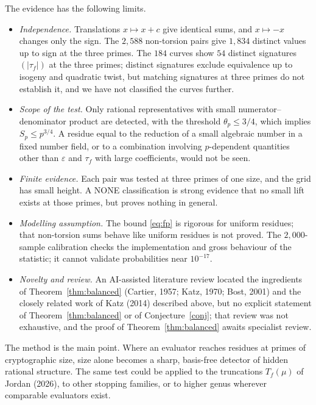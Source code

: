 \documentclass[11pt,a4paper]{article}
\numberwithin{equation}{section}
\theoremstyle{plain}
\theoremstyle{definition}
\newcommand{\eps}{\varepsilon}
\begin{document}
The evidence has the following limits.
\begin{itemize}[leftmargin=1.5em,itemsep=2pt]
\item \emph{Independence.} Translations $x\mapsto x+c$ give identical sums, and $x\mapsto-x$ changes only the sign. The $2{,}588$ non-torsion pairs give $1{,}834$ distinct values up to sign at the three primes. The $184$ curves show $54$ distinct signatures $(|\tau_f|)$ at the three primes; distinct signatures exclude equivalence up to isogeny and quadratic twist, but matching signatures at three primes do not establish it, and we have not classified the curves further.
\item \emph{Scope of the test.} Only rational representatives with small numerator--denominator product are detected, with the threshold $\theta_p\le3/4$, which implies $S_p\le p^{3/4}$. A residue equal to the reduction of a small algebraic number in a fixed number field, or to a combination involving $p$-dependent quantities other than $\eps$ and $\tau_f$ with large coefficients, would not be seen.
\item \emph{Finite evidence.} Each pair was tested at three primes of one size, and the grid has small height. A NONE classification is strong evidence that no small lift exists at those primes, but proves nothing in general.
\item \emph{Modelling assumption.} The bound \eqref{eq:fp} is rigorous for uniform residues; that non-torsion sums behave like uniform residues is not proved. The $2{,}000$-sample calibration checks the implementation and gross behaviour of the statistic; it cannot validate probabilities near $10^{-17}$.
\item \emph{Novelty and review.} An AI-assisted literature review located the ingredients of Theorem~\ref{thm:balanced} (Cartier, 1957; Katz, 1970; Bost, 2001) and the closely related work of Katz (2014) described above, but no explicit statement of Theorem~\ref{thm:balanced} or of Conjecture~\ref{conj}; that review was not exhaustive, and the proof of Theorem~\ref{thm:balanced} awaits specialist review.
\end{itemize}

The method is the main point. Where an evaluator reaches residues at primes of cryptographic size, size alone becomes a sharp, basis-free detector of hidden rational structure. The same test could be applied to the truncations $T_f(\mu)$ of Jordan (2026), to other stopping families, or to higher genus wherever comparable evaluators exist.
\end{document}
